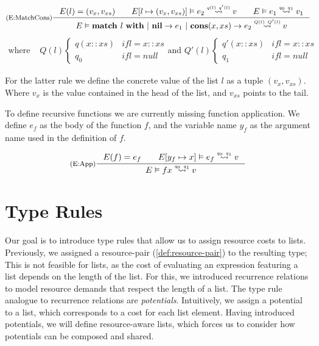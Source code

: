\[
   \inference[(E:MatchCons)]
   {E(l) = (v_x, v_{xs}) \qquad \evals{\envaugment{E}{l}{(v_x, v_{xs})}}{e_2}{v}{q(l)}{q'(l)} \qquad \evals{E}{e_1}{v_1}{q_0}{q_1}}
   {\evals{E}{\listmatch{l}{e_1}{e_2}}{v}{Q(l)}{Q'(l)}}
\]
\[
   \begin{aligned}
      \text{where }  & Q(l) \begin{cases*}
         q(x :: xs)     & if l = x :: xs\\
         q_0            & if l = null
         \end{cases*} \text{and } Q'(l) \begin{cases*}
         q'(x :: xs)     & if l = x :: xs\\
         q_1            & if l = null
      \end{cases*}
   \end{aligned}
\]

For the latter rule we define the concrete value of the list \(l\) as a tuple \((v_x, v_{xs})\). Where \(v_x\) is the value contained in the head of the list, and \(v_{xs}\) points to the tail. 

To define recursive functions we are currently missing function application. We define \(e_f\) as the body of the function \(f\), and the variable name \(y_f\) as the argument name used in the definition of \(f\). 

\[
   \inference[(E:App)]
   {E(f) = e_f \qquad \evals{\envaugment{E}{y_f}{x}}{e_f}{v}{q_0}{q_1}}
   {\evals{E}{f x}{v}{q_0}{q_1}}
\]

\section{Type Rules}

Our goal is to introduce type rules that allow us to assign resource costs to lists. Previously, we assigned a resource-pair (\cref{def:resource-pair}) to the resulting type; This is not feasible for lists, as the cost of evaluating an expression featuring a list depends on the length of the list. For this, we introduced recurrence relations to model resource demands that respect the length of a list. The type rule analogue to recurrence relations are \emph{potentials}. Intuitively, we assign a potential to a list, which corresponds to a cost for each list element. Having introduced potentials, we will define resource-aware lists, which forces us to consider how potentials can be composed and shared.

